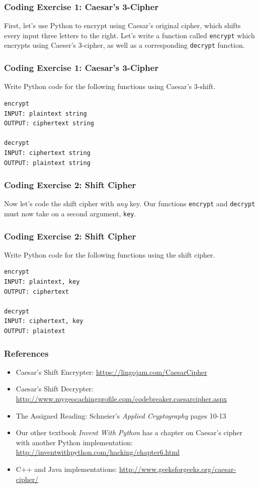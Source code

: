 \documentclass{beamer}
\newcommand{\<}{\langle}
\renewcommand{\>}{\rangle}
\begin{document}
\begin{frame}[fragile]
\frametitle{Coding Exercise 1: Caesar's 3-Cipher}

First, let's use Python to encrypt using Caesar's original cipher, which shifts every input three letters to the right. Let's write a function called \verb|encrypt| which encrypts using Caeser's 3-cipher, as well as a corresponding \verb|decrypt| function.
\end{frame}

\begin{frame}[fragile]
\frametitle{Coding Exercise 1: Caesar's 3-Cipher}

Write Python code for the following functions using Caesar's 3-shift.  
\begin{verbatim}
encrypt
INPUT: plaintext string
OUTPUT: ciphertext string

decrypt
INPUT: ciphertext string
OUTPUT: plaintext string
\end{verbatim}
\end{frame}


\begin{frame}[fragile]
\frametitle{Coding Exercise 2: Shift Cipher}

Now let's code the shift cipher with \emph{any} key. Our functions \verb|encrypt| and \verb|decrypt| must now take on a second argument, \verb|key|.
\end{frame}


\begin{frame}[fragile]
\frametitle{Coding Exercise 2: Shift Cipher}

Write Python code for the following functions using the shift cipher.
\begin{verbatim}
encrypt
INPUT: plaintext, key
OUTPUT: ciphertext

decrypt
INPUT: ciphertext, key
OUTPUT: plaintext
\end{verbatim}
\end{frame}


\begin{frame}
\frametitle{References}

\begin{itemize}
\item Caesar's Shift Encrypter: \url{https://lingojam.com/CaesarCipher}
\item Caesar's Shift Decrypter: \url{http://www.mygeocachingprofile.com/codebreaker.caesarcipher.aspx}
\item The Assigned Reading: Schneier's \emph{Applied Cryptography} pages 10-13
\item Our other textbook \emph{Invent With Python} has a chapter on Caesar's cipher with another Python implementation: \url{http://inventwithpython.com/hacking/chapter6.html}
\item C++ and Java implementations: \url{http://www.geeksforgeeks.org/caesar-cipher/}
\end{itemize}
\end{frame}
\end{document}
